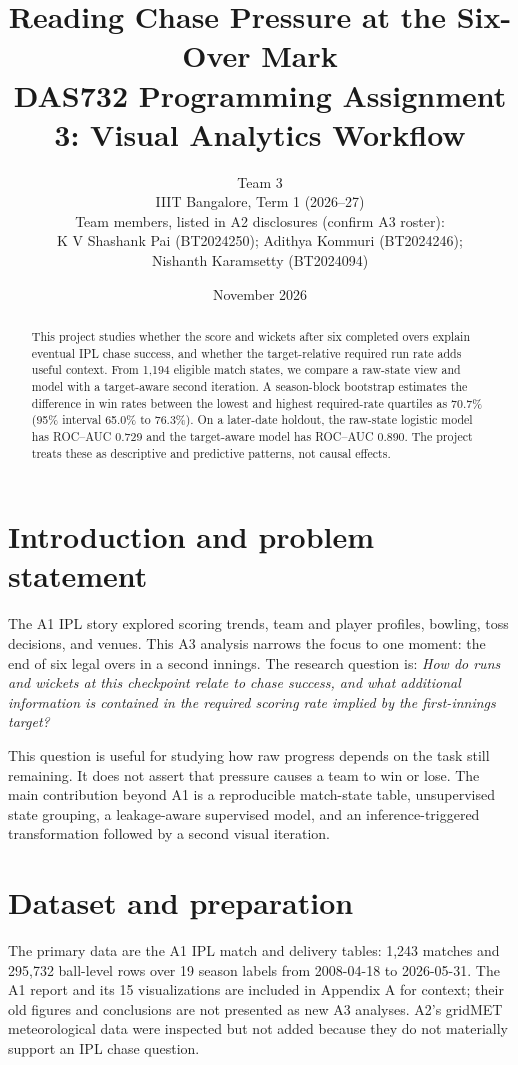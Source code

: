 \documentclass[11pt]{article}
\title{\textbf{Reading Chase Pressure at the Six-Over Mark}\\[0.3em]
\large DAS732 Programming Assignment 3: Visual Analytics Workflow}
\author{Team 3\\\small IIIT Bangalore, Term 1 (2026--27)\\[0.5em]
\small Team members, listed in A2 disclosures (confirm A3 roster):\\
K V Shashank Pai (BT2024250); Adithya Kommuri (BT2024246);\\
Nishanth Karamsetty (BT2024094)}
\date{November 2026}
\begin{document}
\maketitle

\begin{abstract}
This project studies whether the score and wickets after six completed overs explain eventual IPL chase success, and whether the target-relative required run rate adds useful context. From 1,194 eligible match states, we compare a raw-state view and model with a target-aware second iteration. A season-block bootstrap estimates the difference in win rates between the lowest and highest required-rate quartiles as 70.7\% (95\% interval 65.0\% to 76.3\%). On a later-date holdout, the raw-state logistic model has ROC--AUC 0.729 and the target-aware model has ROC--AUC 0.890. The project treats these as descriptive and predictive patterns, not causal effects.
\end{abstract}

\section{Introduction and problem statement}
The A1 IPL story explored scoring trends, team and player profiles, bowling, toss decisions, and venues. This A3 analysis narrows the focus to one moment: the end of six legal overs in a second innings. The research question is: \textit{How do runs and wickets at this checkpoint relate to chase success, and what additional information is contained in the required scoring rate implied by the first-innings target?}

This question is useful for studying how raw progress depends on the task still remaining. It does not assert that pressure causes a team to win or lose. The main contribution beyond A1 is a reproducible match-state table, unsupervised state grouping, a leakage-aware supervised model, and an inference-triggered transformation followed by a second visual iteration.

\section{Dataset and preparation}
The primary data are the A1 IPL match and delivery tables: 1,243 matches and 295,732 ball-level rows over 19 season labels from 2008-04-18 to 2026-05-31. The A1 report and its 15 visualizations are included in Appendix A for context; their old figures and conclusions are not presented as new A3 analyses. A2's gridMET meteorological data were inspected but not added because they do not materially support an IPL chase question.
\end{document}
